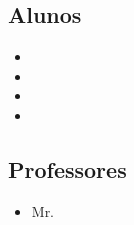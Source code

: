 

\subsection*{Alunos} %
\label{sub:alunos}
\begin{itemize}
	\item \rafael
	\item \thiago
	\item \eduardo
	\item \bruno
\end{itemize}

\subsection*{Professores} %
\label{sub:professores}

\begin{itemize}
	\item Mr. \professor
\end{itemize}
